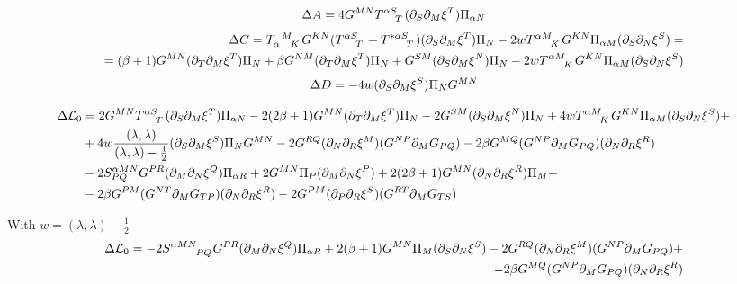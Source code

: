 \documentclass{article}
\begin{document}
\begin{equation}
    \Delta A = 4G^{MN}\tensor{T}{^{\alpha S}_T}(\pd_S\pd_M\xi^T)\Pi_{\alpha N}
\end{equation}
\begin{align*}
    \Delta C = \tensor{T}{_\alpha^M_K}G^{KN}(\tensor{T}{^\alpha^S_T}+\tensor{T}{^{*\alpha S}_T})(\pd_S\pd_M\xi^T)\Pi_N-2w\tensor{T}{^{\alpha}^M_K}G^{KN}\Pi_{\alpha M}(\pd_S\pd_N\xi^S) =\\
    =(\beta+1)G^{MN}(\pd_T\pd_M\xi^T)\Pi_N+\beta G^{NM}(\pd_T\pd_M\xi^T)\Pi_N+G^{SM}(\pd_S\pd_M\xi^N)\Pi_N-2w\tensor{T}{^{\alpha}^M_K}G^{KN}\Pi_{\alpha M}(\pd_S\pd_N\xi^S)
\end{align*}
\begin{equation}
    \Delta D = -4w(\partial_S\partial_M\xi^S)\Pi_N G^{MN}
\end{equation}

\begin{align*}
    \Delta \mathcal{L}_0 &= 2G^{MN}\tensor{T}{^{\alpha S}_T}(\pd_S\pd_M\xi^T)\Pi_{\alpha N}-2(2\beta+1)G^{MN}(\pd_T\pd_M\xi^T)\Pi_N-2G^{SM}(\pd_S\pd_M \xi^N)\Pi_N+4w \tensor{T}{^\alpha ^M_K}G^{KN}\Pi_{\alpha M}(\pd_S\pd_N\xi^S)+\\
    &+4w\frac{(\lambda,\lambda)}{(\lambda,\lambda)-\frac{1}{2}}(\pd_S\pd_M\xi^S)\Pi_N G^{MN}-2G^{RQ}(\pd_N\pd_R\xi^M)(G^{NP}\pd_MG_{PQ})-2\beta G^{MQ}(G^{NP}\pd_M G_{PQ})(\pd_N\pd_R\xi^R)\\
    &-2S^{\alpha MN}_{PQ}G^{PR}(\pd_M\pd_N\xi^Q)\Pi_{\alpha R}+2G^{MN}\Pi_P(\pd_M\pd_N\xi^P)+2(2\beta+1)G^{MN}(\pd_N\pd_R\xi^R)\Pi_M+\\
    &-2\beta G^{PM}(G^{NT}\pd_M G_{TP})(\pd_N\pd_R\xi^R)-2G^{PM}(\pd_P\pd_R\xi^S)(G^{RT}\pd_M G_{TS})
\end{align*}

With $w=(\lambda,\lambda)-\frac{1}{2}$
\begin{align*}
    \Delta \mathcal{L}_0 = -2\tensor{S}{^\alpha^M^N_P_Q}G^{PR}(\pd_M\pd_N\xi^Q)\Pi_{\alpha R}+2(\beta+1)G^{MN}\Pi_M(\pd_S\pd_N\xi^S)-2G^{RQ}(\pd_N\pd_R\xi^M)(G^{NP}\pd_MG_{PQ})+\\
    -2\beta G^{MQ}(G^{NP}\pd_M G_{PQ})(\pd_N\pd_R\xi^R)
\end{align*}
\end{document}
